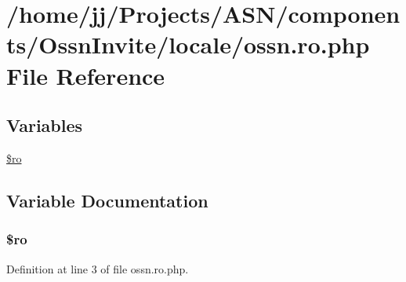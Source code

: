 \hypertarget{components_2_ossn_invite_2locale_2ossn_8ro_8php}{}\section{/home/jj/\+Projects/\+A\+S\+N/components/\+Ossn\+Invite/locale/ossn.ro.\+php File Reference}
\label{components_2_ossn_invite_2locale_2ossn_8ro_8php}
\subsection*{Variables}
\begin{DoxyCompactItemize}
\item 
\hyperlink{components_2_ossn_invite_2locale_2ossn_8ro_8php_ad432e1965f7fa8ce0807b244734e70f8}{\$ro}
\end{DoxyCompactItemize}


\subsection{Variable Documentation}
\subsubsection[{\texorpdfstring{\$ro}{$ro}}]{\setlength{\rightskip}{0pt plus 5cm}\$ro}\hypertarget{components_2_ossn_invite_2locale_2ossn_8ro_8php_ad432e1965f7fa8ce0807b244734e70f8}{}\label{components_2_ossn_invite_2locale_2ossn_8ro_8php_ad432e1965f7fa8ce0807b244734e70f8}


Definition at line 3 of file ossn.\+ro.\+php.

